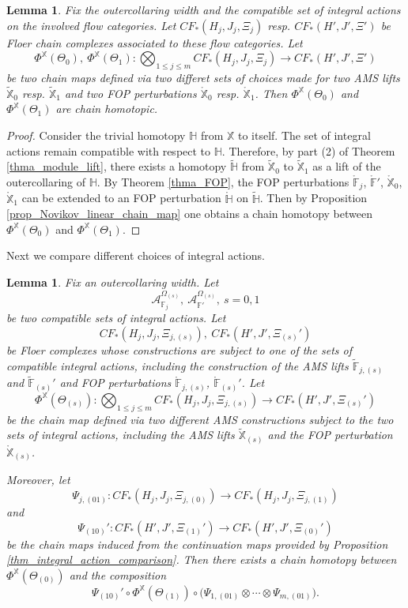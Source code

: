 \documentclass[reqno, 10pt]{amsart}
\numberwithin{equation}{section}
\numberwithin{equation}{section}
\newtheorem{lemma}[thm]{Lemma}
\theoremstyle{definition}
\theoremstyle{remark}
\newcommand{\beqn}{\begin{equation*}}
\newcommand{\eeqn}{\end{equation*}}
\newcommand{\mb}{\mathbb}
\newcommand{\mc}{\mathcal}
\begin{document}
\begin{lemma}\label{lemma132}
Fix the outercollaring width and the compatible set of integral actions on the involved flow categories. Let $CF_*(H_j, J_j, \Xi_j)$ resp. $CF_*(H', J', \Xi')$ be Floer chain complexes associated to these flow categories. Let 
\beqn
\Phi^{\mb{X}}(\Theta_0),\ \Phi^{{\mb X}}(\Theta_1): \bigotimes_{1\leq j \leq m} CF_*(H_j, J_j, \Xi_j) \to CF_*(H', J', \Xi')
\eeqn
be two chain maps defined via two differet sets of choices made for two AMS lifts $\tilde {\mb X}_0$ resp. $\tilde {\mb X}_1$ and two FOP perturbations $\mathring {\mb X}_0$ resp. $\mathring {\mb X}_1$. Then $\Phi^{{\mb X}}(\Theta_0)$ and $\Phi^{{\mb X}}(\Theta_1)$ are chain homotopic.
\end{lemma}

\begin{proof}
Consider the trivial homotopy $\mb{H}$ from ${\mb X}$ to itself. The set of integral actions remain compatible with respect to ${\mb H}$. Therefore, by part (2) of Theorem \ref{thma_module_lift}, there exists a homotopy $\tilde {\mb H}$ from $\tilde {\mb X}_0$ to $\tilde {\mb X}_1$ as a lift of the outercollaring of ${\mb H}$. By Theorem \ref{thma_FOP}, the FOP perturbations $\mathring {\mb F}_j$, $\mathring {\mb F}'$, $\mathring {\mb X}_0$, $\mathring {\mb X}_1$ can be extended to an FOP perturbation $\mathring {\mb H}$ on $\tilde {\mb H}$. Then by Proposition \ref{prop_Novikov_linear_chain_map} one obtains a chain homotopy between $\Phi^{{\mb X}}(\Theta_0)$ and $\Phi^{{\mb X}}(\Theta_1)$.
\end{proof}

Next we compare different choices of integral actions.

\begin{lemma}\label{lemma133}
Fix an outercollaring width. Let 
\beqn
{\mc A}_{{\mb F}_j}^{\Omega_{(s)}},\ {\mc A}_{{\mb F}'}^{\Omega_{(s)}},\ s = 0, 1
\eeqn
be two compatible sets of integral actions. Let
\beqn
CF_*(H_j, J_j, \Xi_{j, (s)}),\ CF_*(H', J', \Xi_{(s)}')
\eeqn
be Floer complexes whose constructions are subject to one of the sets of compatible integral actions, including the construction of the AMS lifts $\tilde {\mb F}_{j, (s)}$ and $\tilde {\mb F}_{(s)}'$ and FOP perturbations $\mathring {\mb F}_{j, (s)}$, $\mathring {\mb F}_{(s)}'$. Let 
\beqn
\Phi^{{\mb X}}(\Theta_{(s)}): \bigotimes_{1 \leq j \leq m} CF_*(H_j, J_j, \Xi_{j, (s)}) \to CF_*(H', J', \Xi_{(s)}')
\eeqn
be the chain map defined via two different AMS constructions subject to the two sets of integral actions, including the AMS lifts $\tilde {\mb X}_{(s)}$ and the FOP perturbation $\mathring {\mb X}_{(s)}$. 

Moreover, let 
\beqn
\Psi_{j, (01)}: CF_*(H_j, J_j, \Xi_{j, (0)}) \to CF_*(H_j, J_j, \Xi_{j, (1)})
\eeqn
and 
\beqn
\Psi_{(10)}': CF_*(H', J', \Xi_{(1)}') \to CF_*(H', J', \Xi_{(0)}')
\eeqn
be the chain maps induced from the continuation maps provided by Proposition \ref{thm_integral_action_comparison}. Then there exists a chain homotopy between $\Phi^{\mb X}(\Theta_{(0)})$ and the composition
\beqn
\Psi_{(10)}' \circ \Phi^{\mb X}(\Theta_{(1)}) \circ \Big( \Psi_{1, (01)} \otimes \cdots \otimes \Psi_{m, (01)} \Big).
\eeqn
\end{lemma}
\end{document}
